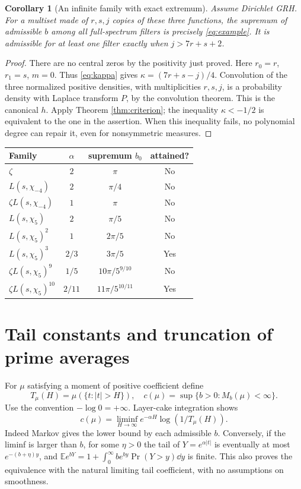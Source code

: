 \documentclass[11pt]{article}
\newtheorem{corollary}[theorem]{Corollary}
\theoremstyle{definition}\newtheorem{definition}[theorem]{Definition}
\theoremstyle{remark}\newtheorem{remark}[theorem]{Remark}
\begin{document}
\begin{corollary}[An infinite family with exact extremum]\label{cor:examples}
Assume Dirichlet GRH. For a multiset made of $r,s,j$ copies of these three functions, the supremum of admissible $b$ among all full-spectrum filters is precisely \eqref{eq:example}. It is admissible for at least one filter exactly when $j>7r+s+2$.
\end{corollary}
\begin{proof}
There are no central zeros by the positivity just proved. Here $r_0=r$, $r_1=s$, $m=0$. Thus \eqref{eq:kappa} gives $\kappa=(7r+s-j)/4$. Convolution of the three normalized positive densities, with multiplicities $r,s,j$, is a probability density with Laplace transform $P$, by the convolution theorem. This is the canonical $h$. Apply Theorem \ref{thm:criterion}; the inequality $\kappa<-1/2$ is equivalent to the one in the assertion. When this inequality fails, no polynomial degree can repair it, even for nonsymmetric measures.
\end{proof}

\begin{center}
\begin{tabular}{@{}lccc@{}}
\toprule
Family & $\alpha$ & supremum $b_0$ & attained?\\\midrule
$\zeta$ & $2$ & $\pi$ & No\\
$L(s,\chi_{-4})$ & $2$ & $\pi/4$ & No\\
$\zeta L(s,\chi_{-4})$ & $1$ & $\pi$ & No\\
$L(s,\chi_5)$ & $2$ & $\pi/5$ & No\\
$L(s,\chi_5)^2$ & $1$ & $2\pi/5$ & No\\
$L(s,\chi_5)^3$ & $2/3$ & $3\pi/5$ & Yes\\
$\zeta L(s,\chi_5)^9$ & $1/5$ & $10\pi/5^{9/10}$ & No\\
$\zeta L(s,\chi_5)^{10}$ & $2/11$ & $11\pi/5^{10/11}$ & Yes\\\bottomrule
\end{tabular}
\end{center}

\section{Tail constants and truncation of prime averages}
For $\mu$ satisfying a moment of positive coefficient define
\[
 T_\mu(H)=\mu(\{t:|t|>H\}),\quad
 c(\mu)=\sup\{b>0:M_b(\mu)<\infty\}.
\]
Use the convention $-\log0=+\infty$. Layer-cake integration shows
\begin{equation}\label{eq:liminf}
 c(\mu)=\liminf_{H\to\infty}e^{-\alpha H}\log(1/T_\mu(H)).
\end{equation}
Indeed Markov gives the lower bound by each admissible $b$. Conversely, if the liminf is larger than $b$, for some $\eta>0$ the tail of $Y=e^{\alpha|t|}$ is eventually at most $e^{-(b+\eta)y}$, and $\mathbb E e^{bY}=1+\int_0^\infty b e^{by}\Pr(Y>y)\dd y$ is finite. This also proves the equivalence with the natural limiting tail coefficient, with no assumptions on smoothness.
\end{document}
